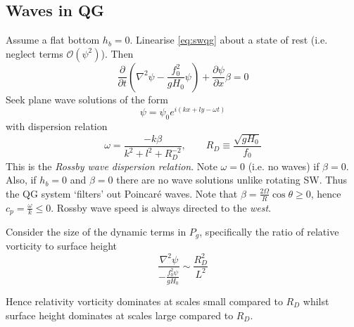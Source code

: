 \documentclass{jknotes}
\begin{document}
\subsection{Waves in QG}
Assume a flat bottom $h_b = 0$. Linearise \eqref{eq:swqg} about a state of
rest (i.e. neglect terms $\mathcal{O}(\psi^2)$). Then
\begin{equation}
	\frac{\partial}{\partial t} \left( \nabla^2 \psi - \frac{f_0^2}{gH_0}
	\psi\right) + \frac{\partial \psi}{\partial x}\beta = 0
\end{equation}
Seek plane wave solutions of the form
\begin{equation}
	\psi = \psi_0 e^{i(kx + ly - \omega t)}
\end{equation}
with dispersion relation
\begin{equation}
	\omega = \frac{-k \beta}{k^2 + l^2 + R_D^{-2}}, \hspace{2em} R_D \equiv
	\frac{\sqrt{gH_0}}{f_0}
\end{equation}
This is the \emph{Rossby wave dispersion relation}. Note $\omega = 0$ (i.e. no
waves) if $\beta = 0$. Also, if $h_b = 0$ and $\beta = 0$ there are no wave
solutions unlike rotating SW. Thus the QG system `filters' out Poincar\'{e}
waves. Note that $\beta = \frac{2 \Omega}{R} \cos \theta \ge 0$, hence $c_p =
\frac{\omega}{k} \le 0$. Rossby wave speed is always directed to the
\emph{west}.

Consider the size of the dynamic terms in $P_g$, specifically the ratio of
relative vorticity to surface height
\begin{equation}
	\frac{\nabla^2 \psi}{-\frac{f_0^2 \psi}{g H_0}} \sim \frac{R_D^2}{L^2}
\end{equation}

Hence relativity vorticity dominates at scales small compared to $R_D$ whilst
surface height dominates at scales large compared to $R_D$.
\end{document}
